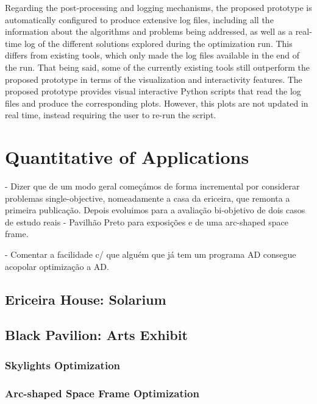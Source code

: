 Regarding the post-processing and logging mechanisms, the proposed prototype is automatically configured to produce extensive log files, including all the information about the algorithms and problems being addressed, as well as a real-time log of the different solutions explored during the optimization run. This differs from existing tools, which only made the log files available in the end of the run. That being said, some of the currently existing tools still outperform the proposed prototype in terms of the visualization and interactivity features. The proposed prototype provides visual interactive Python scripts that read the log files and produce the corresponding plots. However, this plots are not updated in real time, instead requiring the user to re-run the script.

\section{Quantitative of Applications}
\label{sec:quantitative}

- Dizer que de um modo geral começámos de forma incremental por considerar problemas single-objective, nomeadamente a casa da ericeira, que remonta a primeira publicação. Depois evoluimos para a avaliação bi-objetivo de dois casos de estudo reais - Pavilhão Preto para exposições e de uma arc-shaped space frame.

- Comentar a facilidade c/ que alguém que já tem um programa AD consegue acopolar optimização a AD.

\subsection{Ericeira House: Solarium}

\subsection{Black Pavilion: Arts Exhibit}

\subsubsection{Skylights Optimization}
\subsubsection{Arc-shaped Space Frame Optimization}

